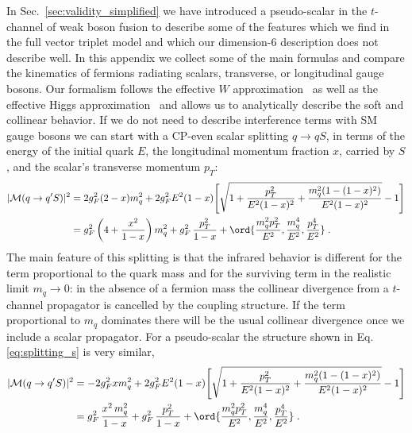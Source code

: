 In Sec.~\ref{sec:validity_simplified} we have introduced a pseudo-scalar in the
$t$-channel of weak boson fusion to describe some of the features
which we find in the full vector triplet model and which our
dimension-6 description does not describe well. In this appendix we
collect some of the main formulas and compare the kinematics of
fermions radiating scalars, transverse, or longitudinal gauge
bosons. Our formalism follows the effective
$W$ approximation~\cite{effective_w} as well as the effective Higgs
approximation~\cite{effective_scalar} and allows us to analytically
describe the soft and collinear behavior. If we do not need to
describe interference terms with SM gauge bosons we can start with a
CP-even scalar splitting $q \to qS$, in terms of the energy of the
initial quark $E$, the longitudinal momentum fraction $x$, carried by $S$, and the
scalar's transverse momentum $p_T$:
%
\begin{align}
 | \mathcal{M}(q \to q'S)  |^2 &= 2 g_F^2 (2-x) m_q^2
                     + 2 g_F^2 E^2 (1-x)
                     \Biggl[ \sqrt{1 + \frac {p_T^2} {E^2 (1-x)^2} + \frac {m_q^2 (1 - (1-x)^2)} {E^2 (1-x)^2} } 
                       - 1 \Biggr] \notag \\
                   &= g_F^2 \left( 4  + \frac {x^2} {1-x} \right) m_q^2
                     + g_F^2 \, \frac {p_T^2} {1-x} 
                     + \ord {\frac{m_q^2 p_T^2}{E^2}, \frac{m_q^4}{E^2}, \frac{p_T^4}{E^2} } \; .
\end{align}
%
The main feature of this splitting is that the infrared behavior is
different for the term proportional to the quark mass and for the
surviving term in the realistic limit $m_q \to 0$: in the absence of a
fermion mass the collinear divergence from a $t$-channel propagator is
cancelled by the coupling structure. If the term proportional to $m_q$
dominates there will be the usual collinear divergence once we include
a scalar propagator. For a pseudo-scalar the structure shown in
Eq.\;\eqref{eq:splitting_s} is very similar,
%
\begin{align}
 |\mathcal{M}(q \to q'S)  |^2 &= - 2 g_F^2 x m_q^2
                     + 2 g_F^2 E^2 (1-x)
                     \Biggl[ \sqrt{1 + \frac {p_T^2} {E^2 (1-x)^2} + \frac {m_q^2 (1 - (1-x)^2)} {E^2 (1-x)^2} } 
                                - 1 \Biggr] \notag \\
                   &= g_F^2 \, \frac {x^2 \, m_q^2} {1-x} 
                     + g_F^2 \,  \frac {p_T^2} {1-x} 
                     + \ord {\frac{m_q^2 p_T^2}{E^2}, \frac{m_q^4}{E^2}, \frac{p_T^4}{E^2} } \;.
\end{align}

